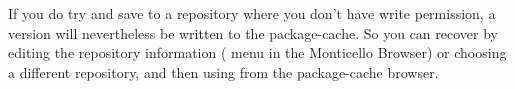 \documentclass[a4paper,10pt,twoside]{book}
\begin{document}
If you do try and save to a repository where you don't have write permission, a version will nevertheless be written to the package-cache.
So you can recover by editing the repository information ( menu in the Monticello Browser) or choosing a different repository, and then using  from the package-cache browser.

\begin{comment}
\subsection{Advanced Monticello} %

Monticello provides some quite sophisticated features for managing versions.
\ab{I've no idea what these things are.}

\damien{Moved from FirstApp where it was too complicated: A good trick
  is to always develop in the same folder. This way you get a copy of
  all the code that you publish on squeaksource on your local
  machine. You can then backup and browse at will.

}
\subsubsection{Scripts}

\subsubsection{Backporting}

\subsubsection{Differences}

\subsubsection{Adopting a new ancestor}

\subsubsection{Setting dependencies}

\subsubsection{Nested packages}


\end{comment}
\end{document}
